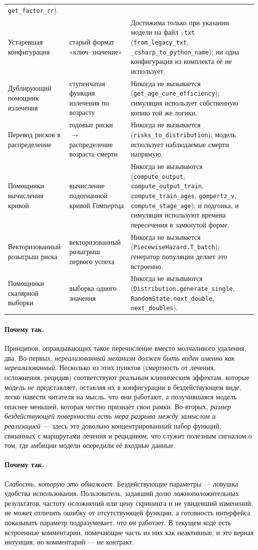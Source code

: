 \documentclass[12pt,a4paper]{article}
\newcommand{\id}[1]{\texttt{#1}}
\newcommand{\why}[1]{\paragraph{Почему так.} #1}
\begin{document}
{\begin{center}
\begin{tabular}{@{}p{4.3cm}p{3.8cm}p{7.2cm}@{}}
\id{get\_factor\_rr}). \\
Устаревшая конфигурация & старый формат «ключ--значение» & Достижима только при указании модели на файл
\id{.txt} (\id{from\_legacy\_txt}, \id{\_csharp\_to\_python\_name}); ни одна конфигурация из комплекта её
не использует. \\
Дублирующий помощник излечения & ступенчатая функция излечения по возрасту & Никогда не вызывается
(\id{get\_age\_cure\_efficiency}); симуляция использует собственную копию той же логики. \\
Перевод рисков в распределение & годовые риски $\rightarrow$ распределение возраста смерти & Никогда не
вызывается (\id{risks\_to\_distribution}); модель использует наблюдаемые смерти напрямую. \\
Помощники вычисления кривой & вычисление подогнанной кривой Гомпертца & Никогда не вызываются
(\id{compute\_output}, \id{compute\_output\_train}, \id{compute\_train\_ages}, \id{gompertz\_v},
\id{compute\_stage\_age}); и подгонка, и симуляция используют времена пересечения в замкнутой форме. \\
Векторизованный розыгрыш риска & векторизованный розыгрыш первого успеха & Никогда не вызывается
(\id{PiecewiseHazard.T\_batch}); генератор популяции делает это встроенно. \\
Помощники скалярной выборки & выборка одного значения & Никогда не вызываются
(\id{Distribution.generate\_single}, \id{RandomState.next\_double}, \id{next\_doubles}). \\
\bottomrule
\end{tabular}
\end{center}}

\why{Принципов, оправдывающих такое перечисление вместо молчаливого удаления, два.
Во-первых, \emph{нереализованный механизм должен быть виден именно как нереализованный}. Несколько из этих
пунктов (смертность от лечения, осложнения, рецидив) соответствуют реальным клиническим эффектам, которые
модель \emph{не} представляет; оставляя их в конфигурации в бездействующем виде, легко навести читателя на
мысль, что они работают, а получившаяся модель опаснее меньшей, которая честно признаёт свои рамки.
Во-вторых, \emph{размер бездействующей поверхности есть мера разрыва между замыслом и реализацией} ---
здесь это довольно концентрированный набор функций, связанных с маршрутами лечения и рецидивом, что служит
полезным сигналом о том, где амбиции модели опередили её входные данные.}

\why{\emph{Слабость, которую это обнажает.} Бездействующие параметры --- ловушка удобства использования.
Пользователь, задавший долю ложноположительных результатов, частоту осложнений или цену скрининга и не
увидевший изменений, не может отличить ошибку от отсутствующей функции, а готовность интерфейса показывать
параметр подразумевает, что он работает. В текущем коде есть встроенные комментарии, помечающие часть из них
как неактивные, и это верная интуиция, но комментарий --- не контракт.}
\end{document}
